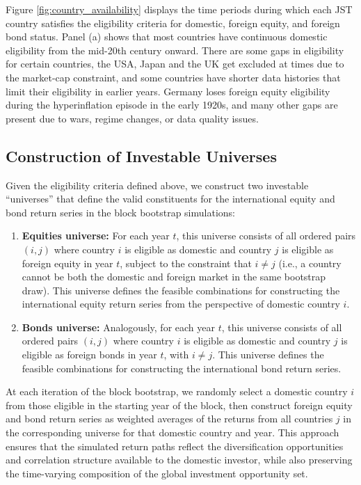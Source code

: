 \documentclass[11pt]{article}
\begin{document}
Figure \ref{fig:country_availability} displays the time periods during which each JST country satisfies the eligibility criteria for domestic, foreign equity, and foreign bond status. Panel (a) shows that most countries have continuous domestic eligibility from the mid-20th century onward. There are some gaps in eligibility for certain countries, the USA, Japan and the UK get excluded at times due to the market-cap constraint, and some countries have shorter data histories that limit their eligibility in earlier years. Germany loses foreign equity eligibility during the hyperinflation episode in the early 1920s, and many other gaps are present due to wars, regime changes, or data quality issues.

\subsection{Construction of Investable Universes}

Given the eligibility criteria defined above, we construct two investable ``universes'' that define the valid constituents for the international equity and bond return series in the block bootstrap simulations:

\begin{enumerate}
    \item \textbf{Equities universe:} For each year $t$, this universe consists of all ordered pairs $(i, j)$ where country $i$ is eligible as domestic and country $j$ is eligible as foreign equity in year $t$, subject to the constraint that $i \neq j$ (i.e., a country cannot be both the domestic and foreign market in the same bootstrap draw). This universe defines the feasible combinations for constructing the international equity return series from the perspective of domestic country $i$.
    
    \item \textbf{Bonds universe:} Analogously, for each year $t$, this universe consists of all ordered pairs $(i, j)$ where country $i$ is eligible as domestic and country $j$ is eligible as foreign bonds in year $t$, with $i \neq j$. This universe defines the feasible combinations for constructing the international bond return series.
\end{enumerate}

At each iteration of the block bootstrap, we randomly select a domestic country $i$ from those eligible in the starting year of the block, then construct foreign equity and bond return series as weighted averages of the returns from all countries $j$ in the corresponding universe for that domestic country and year. This approach ensures that the simulated return paths reflect the diversification opportunities and correlation structure available to the domestic investor, while also preserving the time-varying composition of the global investment opportunity set.
\end{document}
